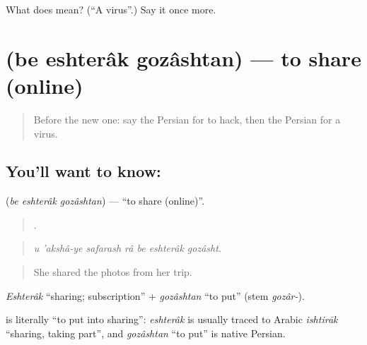 \begin{tcolorbox}[breakable,colback=teal!4,colframe=teal!35!black,title={Before you move on}]
What does  mean? (\textquotedblleft{}A virus\textquotedblright{}.) Say it once more.
\end{tcolorbox}
\section[\texorpdfstring{\fa{به} \fa{اشتراک} \fa{گذاشتن} (be eshterâk gozâshtan)}{به اشتراک گذاشتن (be eshterâk gozâshtan)}]{   (be eshterâk gozâshtan) — to share (online)}

\label{lesson:FA-C419-be-eshterak-gozashtan}



\begin{quote}
Before the new one: say the Persian for to hack, then the Persian for a virus.
\end{quote}

\subsection*{You'll want to know:   }
\textbf{  } (\emph{be eshterâk gozâshtan}) — \textquotedblleft{}to share (online)\textquotedblright{}.

\begin{quote}
      .
\end{quote}

\begin{quote}
\emph{u 'akshâ-ye safarash râ be eshterâk gozâsht.}
\end{quote}

\begin{quote}
She shared the photos from her trip.
\end{quote}

\emph{Eshterâk} \textquotedblleft{}sharing; subscription\textquotedblright{} + \emph{gozâshtan} \textquotedblleft{}to put\textquotedblright{} (stem \emph{gozâr-}).

\begin{cousinweb}
\textbf{  } is literally \textquotedblleft{}to put into sharing\textquotedblright{}: \emph{eshterâk} is usually traced to Arabic \emph{ishtirāk} \textquotedblleft{}sharing, taking part\textquotedblright{}, and \emph{gozâshtan} \textquotedblleft{}to put\textquotedblright{} is native Persian.
\end{cousinweb}

